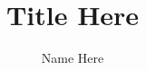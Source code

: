 \documentclass[a4paper,11pt]{ltjreport}
\begin{document}
\title{Title Here}
\author{Name Here}
\date{\the\year}
\maketitle
\tableofcontents






\end{document}
